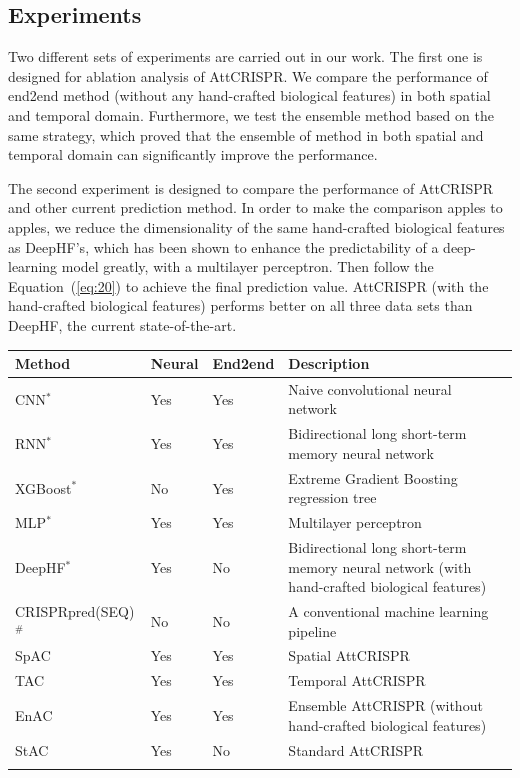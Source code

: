 \documentclass{bioinfo}
\begin{document}
\subsection{Experiments}

Two different sets of experiments are carried out in our work. 
The first one is designed for ablation analysis of AttCRISPR. 
We compare the performance of end2end method (without any hand-crafted biological features) in both spatial and temporal domain. 
Furthermore, we test the ensemble method based on the same strategy, which proved that the ensemble of method in both spatial and temporal domain can significantly improve the performance. 

The second experiment is designed to compare the performance of AttCRISPR and other current prediction method. 
In order to make the comparison apples to apples, we reduce the dimensionality of the same hand-crafted biological features as DeepHF's, 
which has been shown to enhance the predictability of a deep-learning model greatly, with a multilayer perceptron. 
Then follow the Equation~(\ref{eq:20}) to achieve the final prediction value. 
AttCRISPR (with the hand-crafted biological features) performs better on all three data sets than DeepHF, the current state-of-the-art. 

\begin{table}[!tpb]
    {\begin{tabular}{@{}lllp{3.5cm}l@{}}\toprule
        Method & Neural & End2end & Description\\\midrule
        CNN$^*$ & Yes & Yes & Naive convolutional neural network\\
        RNN$^*$ & Yes & Yes & Bidirectional long short-term memory neural network\\
        XGBoost$^*$ & No & Yes & Extreme Gradient Boosting regression tree\\
        MLP$^*$ & Yes & Yes & Multilayer perceptron\\
        DeepHF$^*$ & Yes & No & Bidirectional long short-term memory neural network (with hand-crafted biological features)\\
        CRISPRpred(SEQ)$^{\#}$ & No & No & A conventional machine learning pipeline\\
        SpAC & Yes & Yes & Spatial AttCRISPR\\
        TAC & Yes & Yes & Temporal AttCRISPR\\
        EnAC & Yes & Yes & Ensemble AttCRISPR (without hand-crafted biological features)\\
        StAC & Yes & No & Standard AttCRISPR\\
        \botrule
    \end{tabular}}\footnotesize{}
\end{table}
\end{document}
